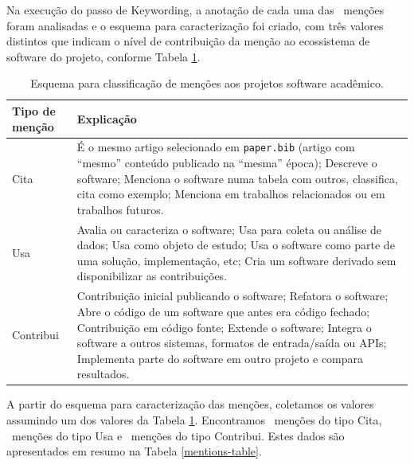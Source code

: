 
Na execução do passo de Keywording, 
a anotação de cada uma das \ScreeningCount \ menções foram analisadas e o
esquema para caracterização foi criado, com três valores distintos que
indicam o nível de contribuição da menção ao ecossistema de software do projeto,
conforme Tabela \ref{esquema-de-mencao}.

\begin{table}[h]
\caption{Esquema para classificação de menções aos projetos software acadêmico.}
\centering
\begin{tabular}{ l p{10cm} }
  \hline
  Tipo de menção           & Explicação \\
  \hline
  Cita      & É o mesmo artigo selecionado em \texttt{paper.bib} (artigo com ``mesmo'' conteúdo publicado na ``mesma'' época); Descreve o software; Menciona o software numa tabela com outros, classifica, cita como exemplo; Menciona em trabalhos relacionados ou em trabalhos futuros. \\
  Usa       & Avalia ou caracteriza o software; Usa para coleta ou análise de dados; Usa como objeto de estudo; Usa o software como parte de uma solução, implementação, etc; Cria um software derivado sem disponibilizar as contribuições. \\
  Contribui & Contribuição inicial publicando o software; Refatora o software; Abre o código de um software que antes era código fechado; Contribuição em código fonte; Extende o software; Integra o software a outros sistemas, formatos de entrada/saída ou APIs; Implementa parte do software em outro projeto e compara resultados. \\
  \hline
\end{tabular}
\label{esquema-de-mencao}
\end{table}


A partir do esquema para caracterização das menções, coletamos os valores
assumindo um dos valores da Tabela \ref{esquema-de-mencao}. Encontramos
\CiteCount \ menções do tipo Cita, \UseCount \ menções do tipo Usa e
\ContributeCount \ menções do tipo Contribui. Estes dados são
apresentados em resumo na Tabela \ref{mentions-table}.

